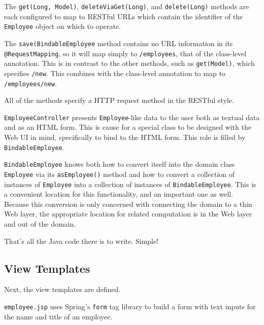 \documentclass{article}
\begin{document}
The \texttt{get(Long, Model)}, \texttt{deleteViaGet(Long)}, and \texttt{delete(Long)} methods are each configured to map to RESTful URLs which contain the identifier of the \texttt{Employee} object on which to operate.

The \texttt{save(BindableEmployee} method contains no URL information in its \texttt{@RequestMapping}, so it will map simply to \texttt{/employees}, that of the class-level annotation.  This is in contrast to the other methods, such as \texttt{get(Model)}, which specifies \texttt{/new}.  This combines with the class-level annotation to map to \texttt{/employees/new}.

All of the methods specify a HTTP request method in the RESTful style.

\texttt{EmployeeController} presents \texttt{Employee}-like data to the user both as textual data and as an HTML form.  This is cause for a special class to be designed with the Web UI in mind, specifically to bind to the HTML form.  This role is filled by \texttt{BindableEmployee}.



\texttt{BindableEmployee} knows both how to convert itself into the domain class \texttt{Employee} via its \texttt{asEmployee()} method and how to convert a collection of instances of \texttt{Employee} into a collection of instances of \texttt{BindableEmployee}.  This is a convenient location for this functionality, and an important one as well.  Because this conversion is only concerned with connecting the domain to a thin Web layer, the appropriate location for related computation is in the Web layer and out of the domain.

That's all the Java code there is to write.  Simple!

\subsection{View Templates}

Next, the view templates are defined.

\texttt{employee.jsp} uses Spring's \texttt{form} tag library to build a form with text inputs for the name and title of an employee.
\end{document}

